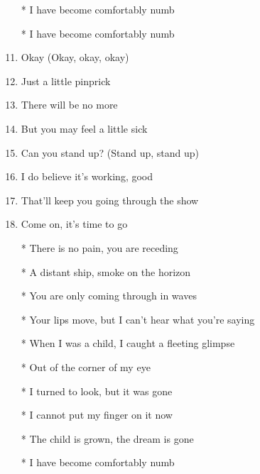 \documentclass{article}
\begin{document}
\begin{enumerate}
        \item[]
        \item[] \chorus
        \item[*] I have become comfortably numb

        \pagebreak

        \item[]
        \item[] \instrumental

        \item[]
        \item[] \chorus
        \item[*] I have become comfortably numb

        \item[]
        \item[] 
        \item Okay (Okay, okay, okay)
        \item Just a little pinprick
        \item There will be no more
        \item But you may feel a little sick
        \item Can you stand up? (Stand up, stand up)
        \item I do believe it's working, good
        \item That'll keep you going through the show
        \item Come on, it's time to go

        \item[]
        \item[] \chorus
        \item[*] There is no pain, you are receding
        \item[*] A distant ship, smoke on the horizon
        \item[*] You are only coming through in waves
        \item[*] Your lips move, but I can't hear what you're saying
        \item[*] When I was a child, I caught a fleeting glimpse
        \item[*] Out of the corner of my eye
        \item[*] I turned to look, but it was gone
        \item[*] I cannot put my finger on it now
        \item[*] The child is grown, the dream is gone

        \item[]
        \item[] \chorus
        \item[*] I have become comfortably numb

        \item[]
        \item[] \instrumental

    \end{enumerate}
\end{document}
